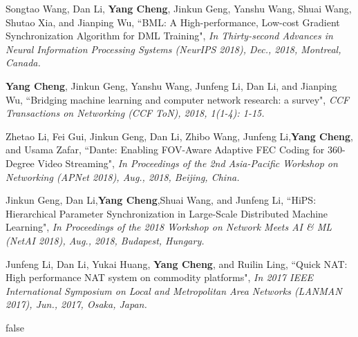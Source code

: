 \documentclass{resume}
\newcommand{\authorlist}[1]{{\textcolor[rgb]{0,0,0}{#1}}}
\newcommand{\papertitle}[1]{{``#1"}}
\newcommand{\publicationaddr}[1]{{\textit{#1}}}
\begin{document}
\begin{enumerate}[label={[\arabic*]}, noitemsep]
	\item \authorlist{Songtao Wang, Dan Li, \textbf{Yang Cheng}, Jinkun Geng, Yanshu Wang, Shuai Wang, Shutao Xia, and Jianping Wu}, \papertitle{BML: A High-performance, Low-cost Gradient Synchronization Algorithm for DML Training}, \publicationaddr{In Thirty-second Advances in Neural Information Processing Systems (NeurIPS 2018), Dec., 2018, Montreal, Canada.}
	
	\item \authorlist{\textbf{Yang Cheng}, Jinkun Geng, Yanshu Wang, Junfeng Li, Dan Li, and Jianping Wu}, \papertitle{Bridging machine learning and computer network research: a survey}, \publicationaddr{CCF Transactions on Networking (CCF ToN), 2018, 1(1-4): 1-15.}
	
	\item \authorlist{Zhetao Li, Fei Gui, Jinkun Geng, Dan Li, Zhibo Wang, Junfeng Li,\textbf{Yang Cheng}, and Usama Zafar}, \papertitle{Dante: Enabling FOV-Aware Adaptive FEC Coding for 360-Degree Video Streaming}, \publicationaddr{In Proceedings of the 2nd Asia-Pacific Workshop on Networking  (APNet 2018), Aug., 2018, Beijing, China.}
	
	\item \authorlist{Jinkun Geng, Dan Li,\textbf{Yang Cheng},Shuai Wang, and Junfeng Li}, \papertitle{HiPS: Hierarchical Parameter Synchronization in Large-Scale Distributed Machine Learning}, \publicationaddr{In Proceedings of the 2018 Workshop on Network Meets AI \& ML (NetAI 2018), Aug., 2018, Budapest, Hungary.}
	
	\item \authorlist{Junfeng Li, Dan Li, Yukai Huang, \textbf{Yang Cheng}, and Ruilin Ling}, \papertitle{Quick NAT: High performance NAT system on commodity platforms}, \publicationaddr{In 2017 IEEE International Symposium on Local and Metropolitan Area Networks (LANMAN 2017), Jun., 2017, Osaka, Japan.}
	
\end{enumerate}




\if false
\end{document}
